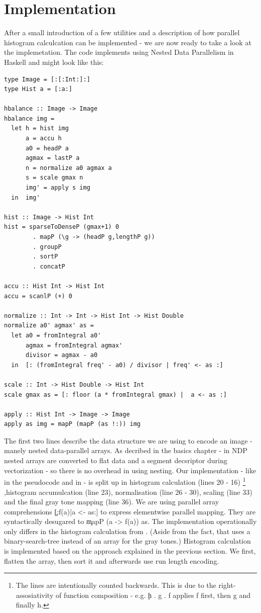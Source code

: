 \section{Implementation}
  After a small introduction of a few utilities and a description of how
  parallel histogram calculcation can be implemented - we are now ready to
  take a look at the implemetation. The code
  implements \algo using Nested Data Parallelism in Haskell and
  might look like this:
  \begin{lstlisting}
type Image = [:[:Int:]:]
type Hist a = [:a:]

hbalance :: Image -> Image
hbalance img =
  let h = hist img
      a = accu h
      a0 = headP a
      agmax = lastP a
      n = normalize a0 agmax a
      s = scale gmax n
      img' = apply s img
  in  img'

hist :: Image -> Hist Int
hist = sparseToDenseP (gmax+1) 0
        . mapP (\g -> (headP g,lengthP g))
        . groupP
        . sortP
        . concatP

accu :: Hist Int -> Hist Int
accu = scanlP (+) 0

normalize :: Int -> Int -> Hist Int -> Hist Double
normalize a0' agmax' as =
  let a0 = fromIntegral a0'
      agmax = fromIntegral agmax'
      divisor = agmax - a0
  in  [: (fromIntegral freq' - a0) / divisor | freq' <- as :]

scale :: Int -> Hist Double -> Hist Int
scale gmax as = [: floor (a * fromIntegral gmax) |  a <- as :]

apply :: Hist Int -> Image -> Image
apply as img = mapP (mapP (as !:)) img
  \end{lstlisting}
  The first two lines describe the data structure we are using to encode an image - 
  manely nested data-parallel arrays.
  As decribed in the basics chapter - in NDP
  nested arrays are converted to flat data and a segment decsriptor
  during vectorization - so there is no overhead in using nesting.
  Our implementation - like in the pseudocode and in \seq - 
  is split up in histogram calculation (lines 20 - 16)
  \footnote{The lines are intentionally counted backwards. This is due to the right-assosiativity of function composition - e.g. \c{h . g . f} applies f first, then g and finally h.}
  ,histogram accumulcation (line 23), normalisation (line 26 - 30),
  scaling (line 33) and the final gray tone mapping (line 36).
  We are using parallel array comprehensions \c{[:f(a)|a <- as:]}
  to express elementwise parallel mapping.
  They are syntactically desugared to \c{mapP (\lam a -> f(a)) as}.
  The implementation operationally only differs in the histogram calculation from \seq.
  (Aside from the fact, that \seq uses a binary-search-tree instead of an array
  for the gray tones.)
  Histogram calculation is implemented based on the approach explained in the
  previous section. We first, flatten the array, then sort it and afterwards
  use run length encoding.
  
